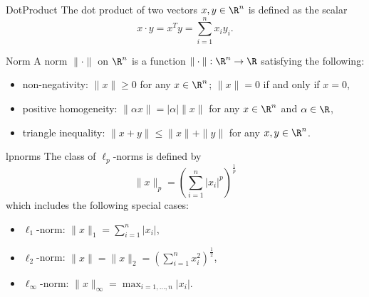 \begin{theo}{DotProduct}
    The dot product of two vectors $x, y \in \R^n$ is defined as the scalar 
    \begin{equation*}
        x \cdot y = x^T y = \sum_{i=1}^n x_i y_i.
    \end{equation*}
    \vspace*{-0.5cm}
\end{theo}

\begin{theo}[Norm]{Norm}
    A norm $\| \cdot \|$ on $\R^n$ is a function $\| \cdot \|: \R^n \to \R$ satisfying the following:
    \begin{itemize}
        \item non-negativity: $\|x\| \geq 0$ for any $x \in \R^n$; $\|x\| = 0$ if and only if $x = 0$,
        \item positive homogeneity: $\|\alpha x\| = |\alpha| \|x\|$ for any $x \in \R^n$ and $\alpha \in \R$,
        \item triangle inequality: $\|x + y\| \leq \|x\| + \|y\|$ for any $x, y \in \R^n$.
    \end{itemize}
    \vspace*{-0.3cm}
\end{theo}

\begin{theo}{lpnorms}
    The class of $\ell_p$-norms is defined by 
    \begin{equation*}
        \|x\|_p = {\left( \sum_{i=1}^n |x_i|^p \right)}^{\frac{1}{p}}
    \end{equation*}
    which includes the following special cases:
    \begin{itemize}
        \item $\ell_1$-norm: $\|x\|_1 = \sum_{i=1}^n |x_i|$,
        \item $\ell_2$-norm: $\|x\| = \|x\|_2 = {\left( \sum_{i=1}^n x_i^2 \right)}^{\frac{1}{2}}$,
        \item $\ell_\infty$-norm: $\|x\|_\infty = \max_{i=1,\ldots,n} |x_i|$.
    \end{itemize}
    \vspace*{-0.3cm}
\end{theo}

